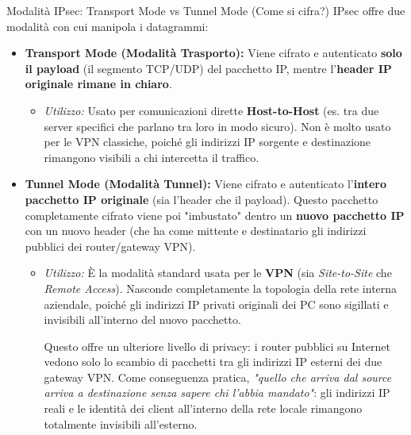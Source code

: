 \documentclass[a4paper,12pt]{report}
\begin{document}
\begin{defbox}{Modalità IPsec: Transport Mode vs Tunnel Mode (Come si cifra?)}
IPsec offre due modalità  con cui manipola i datagrammi:

\begin{itemize}[leftmargin=*]
    \item \textbf{Transport Mode (Modalità Trasporto):} Viene cifrato e autenticato \textbf{solo il payload} (il segmento TCP/UDP) del pacchetto IP, mentre l'\textbf{header IP originale rimane in chiaro}. 
    \begin{itemize}
        \item \textit{Utilizzo:} Usato per comunicazioni dirette \textbf{Host-to-Host} (es. tra due server specifici che parlano tra loro in modo sicuro). Non è molto usato per le VPN classiche, poiché gli indirizzi IP sorgente e destinazione rimangono visibili a chi intercetta il traffico.
    \end{itemize}
    \item \textbf{Tunnel Mode (Modalità Tunnel):} Viene cifrato e autenticato l'\textbf{intero pacchetto IP originale} (sia l'header che il payload). Questo pacchetto completamente cifrato viene poi "imbustato" dentro un \textbf{nuovo pacchetto IP} con un nuovo header (che ha come mittente e destinatario gli indirizzi pubblici dei router/gateway VPN).
    \begin{itemize}
        \item \textit{Utilizzo:} È la modalità standard usata per le \textbf{VPN} (sia \textit{Site-to-Site} che \textit{Remote Access}). Nasconde completamente la topologia della rete interna aziendale, poiché gli indirizzi IP privati originali dei PC sono sigillati e invisibili all'interno del nuovo pacchetto.

        Questo offre un ulteriore livello di privacy: i router pubblici su Internet vedono solo lo scambio di pacchetti tra gli indirizzi IP esterni dei due gateway VPN. Come conseguenza pratica, \textit{"quello che arriva dal source arriva a destinazione senza sapere chi l'abbia mandato"}: gli indirizzi IP reali e le identità dei client all'interno della rete locale rimangono totalmente invisibili all'esterno.
    \end{itemize}
\end{itemize}
\end{defbox}
\end{document}
